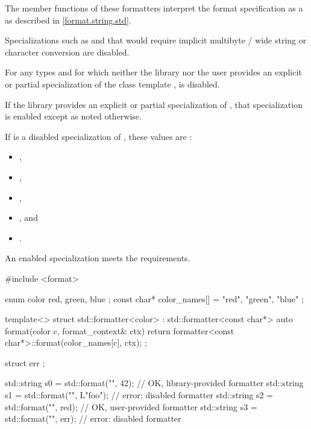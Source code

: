 The  member functions of these formatters
interpret the format specification
as a 
as described in \ref{format.string.std}.
\begin{note}
Specializations such as 
and 
that would require implicit
multibyte / wide string or character conversion are disabled.
\end{note}

\pnum
For any types  and  for which
neither the library nor the user provides
an explicit or partial specialization of
the class template ,
 is disabled.

\pnum
If the library provides an explicit or partial specialization of
, that specialization is enabled
except as noted otherwise.

\pnum
If  is a disabled specialization of , these
values are :
\begin{itemize}
\item {},
\item {},
\item {},
\item {}, and
\item {}.
\end{itemize}

\pnum
An enabled specialization  meets the
 requirements.
\begin{example}
\begin{codeblock}
#include <format>

enum color { red, green, blue };
const char* color_names[] = { "red", "green", "blue" };

template<> struct std::formatter<color> : std::formatter<const char*> {
  auto format(color c, format_context& ctx) {
    return formatter<const char*>::format(color_names[c], ctx);
  }
};

struct err {};

std::string s0 = std::format("{}", 42);         // OK, library-provided formatter
std::string s1 = std::format("{}", L"foo");     // error: disabled formatter
std::string s2 = std::format("{}", red);        // OK, user-provided formatter
std::string s3 = std::format("{}", err{});      // error: disabled formatter
\end{codeblock}
\end{example}

